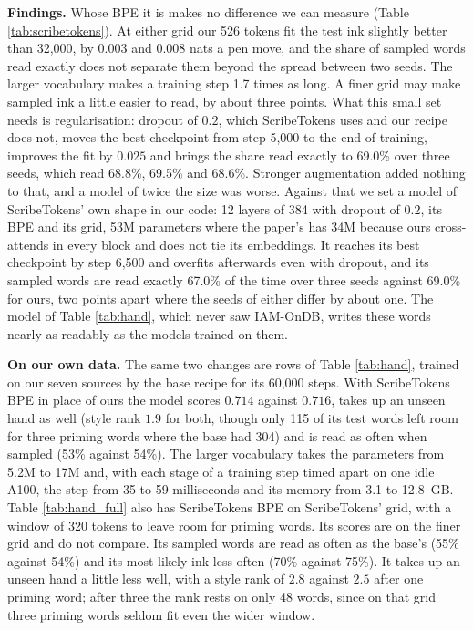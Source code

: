 \documentclass{article}
\begin{document}
\textbf{Findings.} Whose BPE it is makes no difference we can measure (Table \ref{tab:scribetokens}). At either grid our 526 tokens fit the test ink slightly better than 32,000, by $0.003$ and $0.008$ nats a pen move, and the share of sampled words read exactly does not separate them beyond the spread between two seeds. The larger vocabulary makes a training step 1.7 times as long. A finer grid may make sampled ink a little easier to read, by about three points. What this small set needs is regularisation: dropout of $0.2$, which ScribeTokens uses and our recipe does not, moves the best checkpoint from step 5,000 to the end of training, improves the fit by $0.025$ and brings the share read exactly to 69.0\% over three seeds, which read 68.8\%, 69.5\% and 68.6\%. Stronger augmentation added nothing to that, and a model of twice the size was worse. Against that we set a model of ScribeTokens' own shape in our code: 12 layers of 384 with dropout of $0.2$, its BPE and its grid, 53M parameters where the paper's has 34M because ours cross-attends in every block and does not tie its embeddings. It reaches its best checkpoint by step 6,500 and overfits afterwards even with dropout, and its sampled words are read exactly 67.0\% of the time over three seeds against 69.0\% for ours, two points apart where the seeds of either differ by about one. The model of Table \ref{tab:hand}, which never saw IAM-OnDB, writes these words nearly as readably as the models trained on them.

\textbf{On our own data.} The same two changes are rows of Table \ref{tab:hand}, trained on our seven sources by the base recipe for its 60,000 steps. With ScribeTokens BPE in place of ours the model scores $0.714$ against $0.716$, takes up an unseen hand as well (style rank $1.9$ for both, though only 115 of its test words left room for three priming words where the base had 304) and is read as often when sampled (53\% against 54\%). The larger vocabulary takes the parameters from 5.2M to 17M and, with each stage of a training step timed apart on one idle A100, the step from 35 to 59 milliseconds and its memory from 3.1 to 12.8~GB. Table \ref{tab:hand_full} also has ScribeTokens BPE on ScribeTokens' grid, with a window of 320 tokens to leave room for priming words. Its scores are on the finer grid and do not compare. Its sampled words are read as often as the base's (55\% against 54\%) and its most likely ink less often (70\% against 75\%). It takes up an unseen hand a little less well, with a style rank of $2.8$ against $2.5$ after one priming word; after three the rank rests on only 48 words, since on that grid three priming words seldom fit even the wider window.
\end{document}

